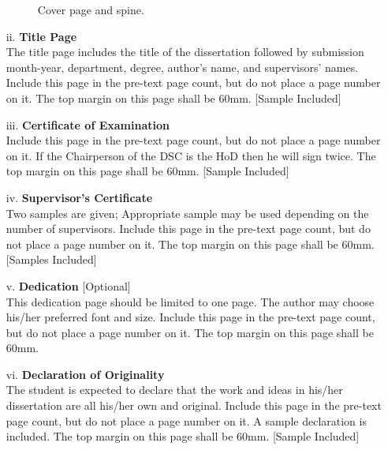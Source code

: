 \begin{itemize}
\begin{figure}[bh!]
\caption{Cover page and spine.}
\label{fig-Ch1-CoverPage}
\end{figure}
\item[ii.] \textbf{Title Page}\\
The title page includes the title of the dissertation followed by submission month-year, department, degree, author's name, and supervisors' names. Include this page in the pre-text page count, but do not place a page number on it. The top margin on this page shall be 60mm. [Sample Included]
\item[iii.] \textbf{Certificate of Examination}\\
Include this page in the pre-text page count, but do not place a page number on it. If the Chairperson of the DSC is the HoD then he will sign twice. The top margin on this page shall be 60mm. [Sample Included]
\item[iv.] \textbf{Supervisor's Certificate}\\
Two samples are given; Appropriate sample may be used depending on the number of supervisors. Include this page in the pre-text page count, but do not place a page number on it. The top margin on this page shall be 60mm. [Samples Included] 
\item[v.] \textbf{Dedication} [Optional]\\
This dedication page should be limited to one page. The author may choose his/her preferred font and size. Include this page in the pre-text page count, but do not place a page number on it. The top margin on this page shall be 60mm. 
\item[vi.] \textbf{Declaration of Originality}\\
The student is expected to declare that the work and ideas in his/her dissertation are all his/her own and original. Include this page in the pre-text page count, but do not place a page number on it. A sample declaration is included. The top margin on this page shall be 60mm. [Sample Included]

\end{itemize}
